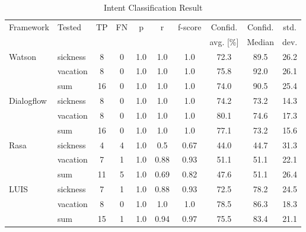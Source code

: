 \begin{table}[h]
    \centering
    \begin{tabular}{ l | l | c | c | c | c | c | c | c | c }
        \multirow{2}{*}{Framework} & \multirow{2}{*}{Tested} & \multirow{2}{*}{TP} & \multirow{2}{*}{FN} & \multirow{2}{*}{p} & \multirow{2}{*}{r} & \multirow{2}{*}{f-score} & Confid. & Confid. & std.\\ 
                 &&          &            &   & & & avg. [\%] & Median & dev.  \\ \hline \hline
        \multirow{3}{*}{Watson} 
        & sickness & 8 & 0& 1.0& 1.0& 1.0&72.3 & 89.5 & 26.2\\
        & vacation & 8 & 0& 1.0& 1.0& 1.0&75.8 & 92.0 & 26.1 \\
        & sum      &16 & 0& 1.0& 1.0& 1.0&74.0 &  90.5 & 25.4 \\ \hline
        
        \multirow{3}{*}{Dialogflow} 
        & sickness & 8& 0& 1.0& 1.0& 1.0&74.2&73.2 & 14.3\\
        & vacation & 8& 0& 1.0& 1.0& 1.0&80.1 & 74.6 & 17.3\\
        & sum      &16& 0& 1.0& 1.0& 1.0&77.1 & 73.2 & 15.6\\ \hline

        \multirow{3}{*}{Rasa} 
        & sickness & 4& 4& 1.0& 0.5  & 0.67& 44.0 &44.7 & 31.3\\
        & vacation & 7& 1& 1.0& 0.88& 0.93& 51.1&51.1& 22.1\\
        & sum      &11& 5& 1.0& 0.69& 0.82& 47.6&51.1 & 26.4\\ \hline

        \multirow{3}{*}{LUIS} 
        & sickness & 7& 1& 1.0& 0.88  & 0.93& 72.5&78.2& 24.5\\
        & vacation & 8& 0& 1.0& 1.0& 1.0& 78.5&86.3 & 18.3\\
        & sum      & 15& 1& 1.0& 0.94& 0.97& 75.5&83.4 & 21.1\\
    \end{tabular}
    \caption{Intent Classification Result} \label{tab:intent_classification_result}
\end{table} \noindent

